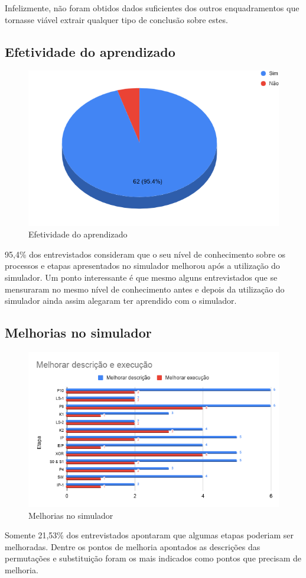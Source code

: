 Infelizmente, não foram obtidos dados suficientes dos outros enquadramentos que tornasse viável extrair qualquer tipo de conclusão sobre estes.

\subsection{Efetividade do aprendizado}

\begin{figure}[H]
    \centering
    \caption{Efetividade do aprendizado}
    \includegraphics[width=.65\linewidth]{Questionario/CQ4.png}
\end{figure}

95,4\% dos entrevistados consideram que o seu nível de conhecimento sobre os processos e etapas apresentados no simulador melhorou após a utilização do simulador. Um ponto interessante é que mesmo alguns entrevistados que se mensuraram no mesmo nível de conhecimento antes e depois da utilização do simulador ainda assim alegaram ter aprendido com o simulador.

\subsection{Melhorias no simulador}

\begin{figure}[H]
    \centering
    \caption{Melhorias no simulador}
    \includegraphics[width=.9\linewidth]{Questionario/CQ5Q6.png}
\end{figure}

Somente 21,53\% dos entrevistados apontaram que algumas etapas poderiam ser melhoradas. Dentre os pontos de melhoria apontados as descrições das permutações e substituição foram os mais indicados como pontos que precisam de melhoria.

